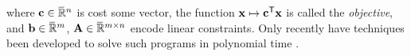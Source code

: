\documentclass[twoside]{article}
\begin{document}
where $\mathbf{c} \in \mskip1mu\overline{\mskip-1mu\mathbb R\!}\,^{n}$ is cost some vector,
the function $\mathbf{x} \mapsto \mathbf{c}^{\sf T} \mathbf{x}$ is called the \emph{objective},
and $\mathbf{b} \in \mskip1mu\overline{\mskip-1mu\mathbb R\!}\,^m$, $\mathbf{A} \in \mskip1mu\overline{\mskip-1mu\mathbb R\!}\,^{m \times n}$ encode linear constraints.
%
{\color{red} Only recently} have techniques
 been developed to solve such programs in polynomial time \parencite{badenbroek2021algorithm,dahl2022primal}.
\end{document}
